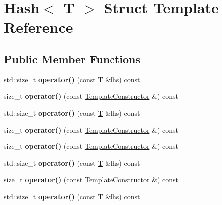 \hypertarget{struct_hash}{}\section{Hash$<$ T $>$ Struct Template Reference}
\label{struct_hash}
\subsection*{Public Member Functions}
\begin{DoxyCompactItemize}
\item 
\mbox{\label{struct_hash_a9e29651e66d0393f09f437fcc25ba8a9}} 
std\+::size\+\_\+t {\bfseries operator()} (const \mbox{\hyperlink{struct_t}{T}} \&lhs) const
\item 
\mbox{\label{struct_hash_a132c45421536970ec498808856f3b265}} 
size\+\_\+t {\bfseries operator()} (const \mbox{\hyperlink{struct_template_constructor}{Template\+Constructor}} \&) const
\item 
\mbox{\label{struct_hash_a9e29651e66d0393f09f437fcc25ba8a9}} 
std\+::size\+\_\+t {\bfseries operator()} (const \mbox{\hyperlink{struct_t}{T}} \&lhs) const
\item 
\mbox{\label{struct_hash_a132c45421536970ec498808856f3b265}} 
size\+\_\+t {\bfseries operator()} (const \mbox{\hyperlink{struct_template_constructor}{Template\+Constructor}} \&) const
\item 
\mbox{\label{struct_hash_a132c45421536970ec498808856f3b265}} 
size\+\_\+t {\bfseries operator()} (const \mbox{\hyperlink{struct_template_constructor}{Template\+Constructor}} \&) const
\item 
\mbox{\label{struct_hash_a9e29651e66d0393f09f437fcc25ba8a9}} 
std\+::size\+\_\+t {\bfseries operator()} (const \mbox{\hyperlink{struct_t}{T}} \&lhs) const
\item 
\mbox{\label{struct_hash_a132c45421536970ec498808856f3b265}} 
size\+\_\+t {\bfseries operator()} (const \mbox{\hyperlink{struct_template_constructor}{Template\+Constructor}} \&) const
\item 
\mbox{\label{struct_hash_a9e29651e66d0393f09f437fcc25ba8a9}} 
std\+::size\+\_\+t {\bfseries operator()} (const \mbox{\hyperlink{struct_t}{T}} \&lhs) const
\end{DoxyCompactItemize}


